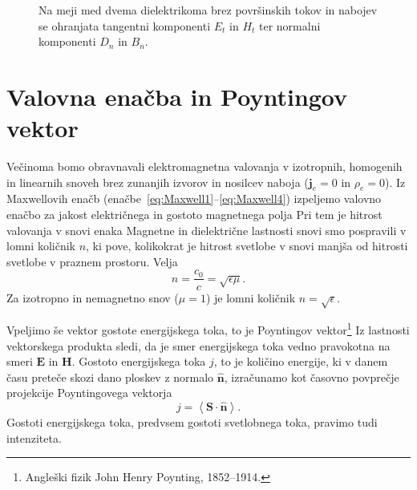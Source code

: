 \begin{figure}[h]
\centering
  \def\svgwidth{75truemm} 
  
\caption{Na meji med dvema dielektrikoma brez površinskih tokov
in nabojev se ohranjata tangentni komponenti $E_t$ in $H_t$ ter 
normalni komponenti $D_n$ in $B_n$.}
\label{fig:Robni-pogoji}
\end{figure}

\section{Valovna enačba in Poyntingov vektor}
Večinoma bomo obravnavali elektromagnetna valovanja v izotropnih, 
homogenih in linearnih snoveh brez zunanjih izvorov in
nosilcev naboja ($\mathbf{j}_e=0$ in $\rho_{e}=0$). 
Iz Maxwellovih enačb (enačbe~\ref{eq:Maxwell1}--\ref{eq:Maxwell4}) izpeljemo valovno 
enačbo za jakost električnega in gostoto magnetnega polja 
Pri tem je hitrost valovanja v snovi enaka 
Magnetne in dielektrične lastnosti snovi smo pospravili
v lomni količnik $n$, ki pove, kolikokrat je hitrost 
svetlobe v snovi manjša od hitrosti svetlobe v praznem prostoru. Velja
\begin{equation}
n=\frac{c_{0}}{c}=\sqrt{\epsilon\mu}.
\end{equation}
Za izotropno in nemagnetno snov ($\mu=1$) je lomni količnik $n=\sqrt{\epsilon}$.

Vpeljimo še vektor gostote energijskega toka, to je Poyntingov 
vektor\footnote{Angleški fizik John Henry Poynting, 1852--1914.} 
Iz lastnosti vektorskega produkta sledi, da je smer energijskega toka vedno pravokotna na 
smeri $\mathbf{E}$ in $\mathbf{H}$. Gostoto energijskega toka $j$, to je količino
energije, ki v danem času preteče skozi dano ploskev
z normalo $\mathbf{\hat{n}}$, izračunamo kot časovno povprečje projekcije
Poyntingovega vektorja 
\begin{equation}
j=\left\langle \mathbf{\mathbf{S}}\cdot\mathbf{\hat{n}}\right\rangle.
\end{equation}
Gostoti energijskega toka, predvsem gostoti svetlobnega toka, pravimo tudi 
intenziteta.

